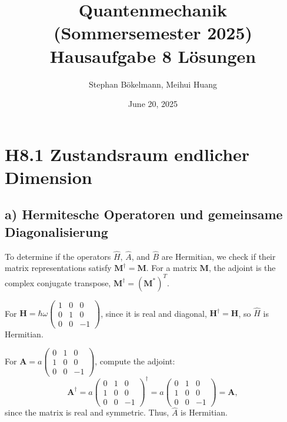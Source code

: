 \documentclass[a4paper,12pt]{article}
\begin{document}
\title{Quantenmechanik (Sommersemester 2025) \\ Hausaufgabe 8 Lösungen}
\author{Stephan Bökelmann, Meihui Huang}
\date{June 20, 2025}
\maketitle

\section*{H8.1 Zustandsraum endlicher Dimension}

\subsection*{a) Hermitesche Operatoren und gemeinsame Diagonalisierung}

To determine if the operators $\hat{H}$, $\hat{A}$, and $\hat{B}$ are Hermitian, we check if their matrix representations satisfy $\boldsymbol{M}^\dagger = \boldsymbol{M}$. For a matrix $\boldsymbol{M}$, the adjoint is the complex conjugate transpose, $\boldsymbol{M}^\dagger = (\boldsymbol{M}^*)^T$.

For $\boldsymbol{H} = \hbar \omega \begin{pmatrix} 1 & 0 & 0 \\ 0 & 1 & 0 \\ 0 & 0 & -1 \end{pmatrix}$, since it is real and diagonal, $\boldsymbol{H}^\dagger = \boldsymbol{H}$, so $\hat{H}$ is Hermitian.

For $\boldsymbol{A} = a \begin{pmatrix} 0 & 1 & 0 \\ 1 & 0 & 0 \\ 0 & 0 & -1 \end{pmatrix}$, compute the adjoint:
\[
\boldsymbol{A}^\dagger = a \begin{pmatrix} 0 & 1 & 0 \\ 1 & 0 & 0 \\ 0 & 0 & -1 \end{pmatrix}^\dagger = a \begin{pmatrix} 0 & 1 & 0 \\ 1 & 0 & 0 \\ 0 & 0 & -1 \end{pmatrix} = \boldsymbol{A},
\]
since the matrix is real and symmetric. Thus, $\hat{A}$ is Hermitian.
\end{document}
